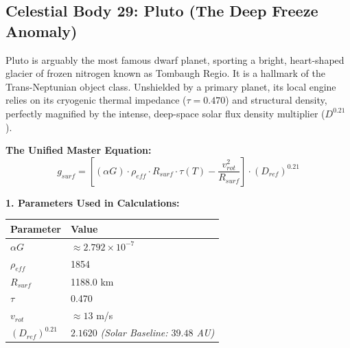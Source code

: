 \documentclass[11pt, a4paper]{article}
\begin{document}
\clearpage
\subsection{Celestial Body 29: Pluto (The Deep Freeze Anomaly)}
  Pluto is arguably the most famous dwarf planet, sporting a bright, heart-shaped glacier of frozen nitrogen known as Tombaugh Regio. It is a hallmark of the Trans-Neptunian object class. Unshielded by a primary planet, its local engine relies on its cryogenic thermal impedance ($\tau = 0.470$) and structural density, perfectly magnified by the intense, deep-space solar flux density multiplier ($D^{0.21}$).

  \vspace{0.5em}
  \noindent \textbf{The Unified Master Equation:}
  $$ g_{surf} = \left[ (\alpha G) \cdot \rho_{eff} \cdot R_{surf} \cdot \tau(T) - \frac{v_{rot}^2}{R_{surf}} \right] \cdot (D_{ref})^{0.21} $$

  \vspace{0.5em}
  \noindent \textbf{1. Parameters Used in Calculations:} \\[0.5em]
  \begingroup
  \renewcommand{\arraystretch}{1.3}
  \hspace*{2em}
  \begin{tabular}{|l|l|}
    \hline
    \textbf{Parameter} & \textbf{Value} \\ \hline
    $\alpha G$ & $\approx 2.792 \times 10^{-7}$ \\ \hline
    $\rho_{eff}$ & 1854 \\ \hline
    $R_{surf}$ & 1188.0 km \\ \hline
    $\tau$ & 0.470 \\ \hline
    $v_{rot}$ & $\approx 13$ m/s \\ \hline
    $(D_{ref})^{0.21}$ & $2.1620$ \textit{(Solar Baseline: $39.48$ AU)} \\ \hline
  \end{tabular}
  \endgroup
\end{document}
